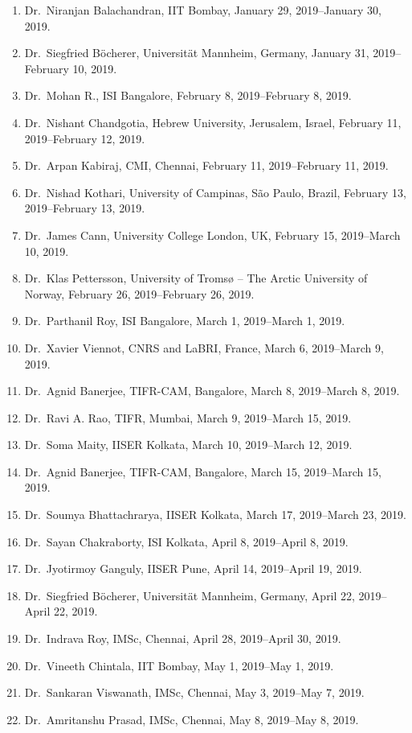 \begin{enumerate}
\item Dr.~Niranjan Balachandran, IIT Bombay, January 29, 2019--January 30, 2019.
\item Dr.~Siegfried Böcherer, Universität Mannheim, Germany, January 31, 2019--February 10, 2019.
\item Dr.~Mohan R., ISI Bangalore, February 8, 2019--February 8, 2019.
\item Dr.~Nishant Chandgotia, Hebrew University, Jerusalem, Israel, February 11, 2019--February 12, 2019.
\item Dr.~Arpan Kabiraj, CMI, Chennai, February 11, 2019--February 11, 2019.
\item Dr.~Nishad Kothari, University of Campinas, São Paulo, Brazil, February 13, 2019--February 13, 2019.
\item Dr.~James Cann, University College London, UK, February 15, 2019--March 10, 2019.
\item Dr.~Klas Pettersson, University of Tromsø – The Arctic University of Norway, February 26, 2019--February 26, 2019.
\item Dr.~Parthanil Roy, ISI Bangalore, March 1, 2019--March 1, 2019.
\item Dr.~Xavier Viennot, CNRS and LaBRI, France, March 6, 2019--March 9, 2019.
\item Dr.~Agnid Banerjee, TIFR-CAM, Bangalore, March 8, 2019--March 8, 2019.
\item Dr.~Ravi A. Rao, TIFR, Mumbai, March 9, 2019--March 15, 2019.
\item Dr.~Soma Maity, IISER Kolkata, March 10, 2019--March 12, 2019.
\item Dr.~Agnid Banerjee, TIFR-CAM, Bangalore, March 15, 2019--March 15, 2019.
\item Dr.~Soumya Bhattachrarya, IISER Kolkata, March 17, 2019--March 23, 2019.
\item Dr.~Sayan Chakraborty, ISI Kolkata, April 8, 2019--April 8, 2019.
\item Dr.~Jyotirmoy Ganguly, IISER Pune, April 14, 2019--April 19, 2019.
\item Dr.~Siegfried Böcherer, Universität Mannheim, Germany, April 22, 2019--April 22, 2019.
\item Dr.~Indrava Roy, IMSc, Chennai, April 28, 2019--April 30, 2019.
\item Dr.~Vineeth Chintala, IIT Bombay, May 1, 2019--May 1, 2019.
\item Dr.~Sankaran Viswanath, IMSc, Chennai, May 3, 2019--May 7, 2019.
\item Dr.~Amritanshu Prasad, IMSc, Chennai, May 8, 2019--May 8, 2019.

\end{enumerate}
